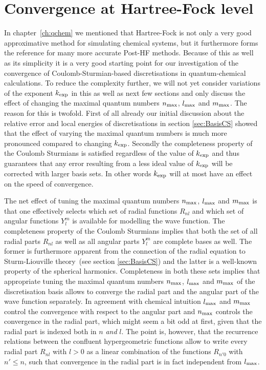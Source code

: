 \section{Convergence at Hartree-Fock level}
\label{sec:CSconvergenceHF}
In chapter~\vref{ch:qchem} we mentioned that Hartree-Fock
is not only a very good approximative method for simulating chemical systems,
but it furthermore forms the reference for many more accurate Post-HF methods.
Because of this as well as its simplicity it is a very good
starting point for our investigation of the convergence
of Coulomb-Sturmian-based discretisations in quantum-chemical calculations.
To reduce the complexity further,
we will not yet consider variations of the \CS exponent $k_\text{exp}$ in this as well as
next few sections
and only discuss the effect of changing the maximal quantum numbers
$n_\text{max}$, $l_\text{max}$ and $m_\text{max}$.
The reason for this is twofold.
First of all already our initial discussion
about the relative error and local energies of \CS discretisations
in section \vref{sec:BasisCS}
showed that the effect of varying the maximal quantum numbers
is much more pronounced compared to changing $k_\text{exp}$.
Secondly the completeness property of the Coulomb Sturmians
is satisfied regardless of the value of $k_\text{exp}$
and thus guarantees that any error resulting from a less ideal
value of $k_\text{exp}$ will be corrected with larger basis sets.
In other words $k_\text{exp}$ will at most have an effect on the speed of convergence.

The net effect of tuning the maximal quantum numbers $n_\text{max}$, $l_\text{max}$ and $m_\text{max}$
is that one effectively selects which set of radial functions $R_{nl}$
and which set of angular functions $Y_l^m$ is available for modelling the wave function.
The completeness property of the Coulomb Sturmians
implies that both the set of all
radial parts $R_{nl}$ as well as all angular parts $Y_l^m$ are complete bases as well.
The former is furthermore apparent from the connection of the \CS radial equation
to Sturm-Liouville theory~(see section \vref{sec:BasisCS})
and the latter is a well-known property of the spherical harmonics.
Completeness in both these sets implies
that appropriate tuning the maximal quantum numbers $n_\text{max}$, $l_\text{max}$ and $m_\text{max}$
of the discretisation basis
allows to converge the radial part and the angular part of the wave function separately.
In agreement with chemical intuition
$l_\text{max}$ and $m_\text{max}$ control the convergence with respect to the angular part
and $n_\text{max}$ controls the convergence in the radial part,
which might seem a bit odd at first, given that the radial
part is indexed both in $n$ \emph{and} $l$.
The point is, however, that the recurrence relations between the
confluent hypergeometric functions
allow to write every radial part $R_{nl}$ with $l>0$
as a linear combination of the functions $R_{n'0}$ with $n' \leq n$,
such that convergence in the radial part is in fact independent from $l_\text{max}$.


